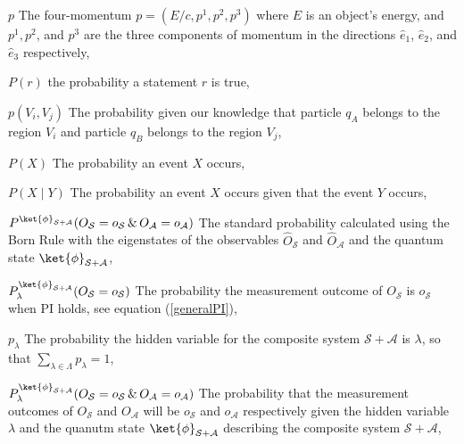 \begin{thenomenclature}
  \item [{$p$}]\begingroup The four-momentum $p=(E/c, p^1, p^2, p^3)$ where $E$ is an object's energy, and $p^1, p^2$, and $p^3$    are the three components of momentum in the directions $\hat{e}_1$, $\hat{e}_2$, and $\hat{e}_3$ respectively, \nomrefpage{}
  \item [{$P(r)$}]\begingroup the probability a statement $r$ is true, \nomrefpage{}
  \item [{$p(V_i, V_j)$}]\begingroup The probability given our knowledge that particle  $q_A$ belongs to the region $V_i$ and particle $q_B$ belongs to the region $V_j$, \nomrefpage{}
  \item [{$P(X)$}]\begingroup The probability an event $X$ occurs, \nomrefpage{}
  \item [{$P(X\mid Y)$}]\begingroup The probability an event $X$ occurs given that the event $Y$ occurs, \nomrefpage{}
  \item [{$P^{\ket{\phi}_{\mathcal{S}+\mathcal{A}}}(O_\mathcal{S}=o_\mathcal{S}\, \& \,O_\mathcal{A}=o_\mathcal{A})$}]\begingroup The standard probability calculated using the Born Rule with the eigenstates of the observables $\hat{O}_\mathcal{S}$ and $\hat{O}_\mathcal{A}$ and the quantum state $\ket{\phi}_{\mathcal{S}+\mathcal{A}}$, \nomrefpage{}
  \item [{$P^{\ket{\phi}_{\mathcal{S}+\mathcal{A}}}_{\lambda}(O_\mathcal{S}=o_\mathcal{S})$}]\begingroup The probability the measurement outcome of $O_\mathcal{S}$ is $o_\mathcal{S}$ when PI holds, see equation (\ref{generalPI}), \nomrefpage{}
  \item [{$p_\lambda$}]\begingroup The probability the hidden variable for the composite system $\mathcal{S}+\mathcal{A}$ is $\lambda$, so that $\sum_{\lambda\in\Lambda} p_\lambda = 1$, \nomrefpage{}
  \item [{$P_\lambda^{\ket{\phi}_{\mathcal{S}+\mathcal{A}}}(O_\mathcal{S}=o_\mathcal{S}\, \& \, O_\mathcal{A}=o_\mathcal{A})$}]\begingroup The probability that the measurement outcomes of $O_{\mathcal{S}}$ and $O_{\mathcal{A}}$ will be $o_{\mathcal{S}}$  and $o_{\mathcal{A}}$ respectively given the hidden variable $\lambda$ and the quanutm state $\ket{\phi}_{\mathcal{S}+\mathcal{A}}$ describing the composite system $\mathcal{S}+\mathcal{A}$, \nomrefpage{}

\end{thenomenclature}
